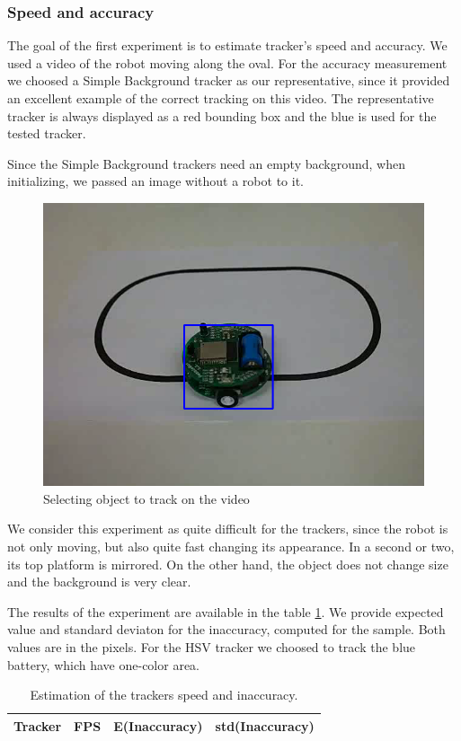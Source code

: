\subsubsection{Speed and accuracy}

The goal of the first experiment is to estimate tracker's speed and accuracy. We used a
video of the robot moving along the oval. For the accuracy measurement we
choosed a Simple Background tracker as our representative, since it provided an
excellent example of the correct tracking on this video. The representative
tracker is always displayed as a red bounding box and the blue is used for the
tested tracker.

Since the Simple Background trackers need an empty background, when
initializing, we passed an image without a robot to it.

\begin{figure}
\centering
\includegraphics[width=0.6\linewidth]{img/robot-oval.png}
\caption{Selecting object to track on the video}
\label{fig:robot-oval}
\end{figure}

We consider this experiment as quite difficult for the trackers, since the
robot is not only moving, but also quite fast changing its appearance. In a
second or two, its top platform is mirrored. On the other hand, the object does
not change size and the background is very clear.

The results of the experiment are available in the table
\ref{table:experiment-robot}. We provide expected value and standard deviaton
for the inaccuracy, computed for the sample. Both values are in the pixels. For
the HSV tracker we choosed to track the blue battery, which have one-color area.

\begin{table}
\centering
\begin{tabular}{l|l|l|l}
Tracker	& FPS & E(Inaccuracy) & std(Inaccuracy) \\
\hline

\end{tabular}
\caption{Estimation of the trackers speed and inaccuracy.}
\label{table:experiment-robot}
\end{table}

